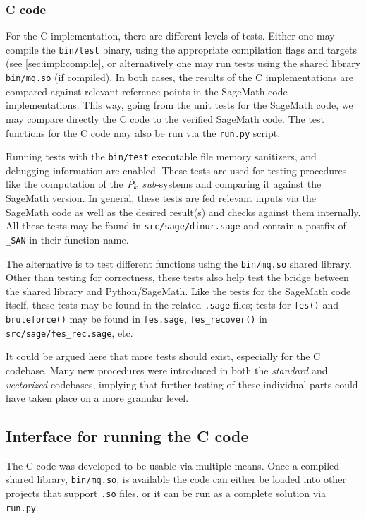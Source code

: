 \subsubsection{C code}

For the C implementation, there are different levels of tests. Either one may compile the \texttt{bin/test} binary, using the appropriate compilation flags and targets (see \cref{sec:impl:compile}, or alternatively one may run tests using the shared library \texttt{bin/mq.so} (if compiled). In both cases, the results of the C implementations are compared against relevant reference points in the SageMath code implementations. This way, going from the unit tests for the SageMath code, we may compare directly the C code to the verified SageMath code. The test functions for the C code may also be run via the \texttt{run.py} script.

Running tests with the \texttt{bin/test} executable file memory sanitizers, and debugging information are enabled. These tests are used for testing procedures like the computation of the $\Tilde{P}_k$ \textit{sub}-systems and comparing it against the SageMath version. In general, these tests are fed relevant inputs via the SageMath code as well as the desired result(s) and checks against them internally. All these tests may be found in \texttt{src/sage/dinur.sage} and contain a postfix of \texttt{\_SAN} in their function name.

The alternative is to test different functions using the \texttt{bin/mq.so} shared library. Other than testing for correctness, these tests also help test the bridge between the shared library and Python/SageMath. Like the tests for the SageMath code itself, these tests may be found in the related \texttt{.sage} files; tests for \texttt{fes()} and \texttt{bruteforce()} may be found in \texttt{fes.sage}, \texttt{fes\_recover()} in \texttt{src/sage/fes\_rec.sage}, etc.

It could be argued here that more tests should exist, especially for the C codebase. Many new procedures were introduced in both the \textit{standard} and \textit{vectorized} codebases, implying that further testing of these individual parts could have taken place on a more granular level.

\subsection{Interface for running the C code} \label{sec:impl:interface}
The C code was developed to be usable via multiple means. Once a compiled shared library, \texttt{bin/mq.so}, is available the code can either be loaded into other projects that support \texttt{.so} files, or it can be run as a complete solution via \texttt{run.py}. 

